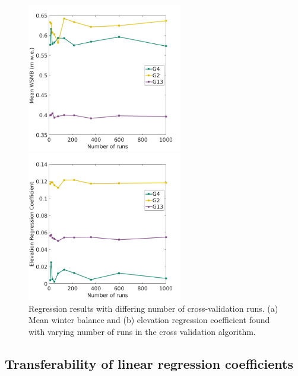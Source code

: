 \documentclass{sfuthesis}
\begin{document}
{\begin{figure}[t]
\begin{minipage}[l][8cm][t]{.58\textwidth}
        \vspace*{\fill}
  \centering
  \includegraphics[height=6.5cm]{MLRrunWSMB.png}
  \subcaption{}
\end{minipage}%
\begin{minipage}[l][8cm][t]{.38\textwidth}
        \vspace*{\fill} 
          \centering
         \includegraphics[height=6.5cm]{MLRrunCoeffs.png}
  \subcaption{}
  \end{minipage}%

\caption[Regression results with differing number of cross-validation runs]{Regression results with differing number of cross-validation runs. (a) Mean winter balance and (b) elevation regression coefficient found with varying number of runs in the cross validation algorithm. }
\label{fig:MLRruns}
\end{figure}



\subsection{Transferability of linear regression coefficients}
\label{sec:transferability}

}
\end{document}

